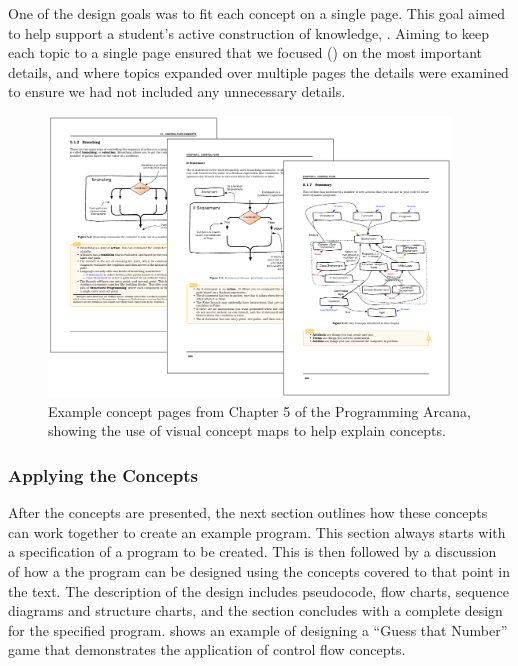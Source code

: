 One of the design goals was to fit each concept on a single page. This goal aimed to help support a student's active construction of knowledge, . Aiming to keep each topic to a single page ensured that we focused () on the most important details, and where topics expanded over multiple pages the details were examined to ensure we had not included any unnecessary details.

\begin{figure}[h]
  \centering
  \includegraphics[width=0.95\textwidth]{ArcanaConcepts}
  \caption{Example concept pages from Chapter 5 of the Programming Arcana, showing the use of visual concept maps to help explain concepts. }
  \label{fig:arcana_concepts}
\end{figure}

\clearpage
\subsubsection{Applying the Concepts} %
\label{par:applying_the_concepts_}

After the concepts are presented, the next section outlines how these concepts can work together to create an example program. This section always starts with a specification of a program to be created. This is then followed by a discussion of how a the program can be designed using the concepts covered to that point in the text. The description of the design includes pseudocode, flow charts, sequence diagrams and structure charts, and the section concludes with a complete design for the specified program.  shows an example of designing a ``Guess that Number'' game that demonstrates the application of control flow concepts.

